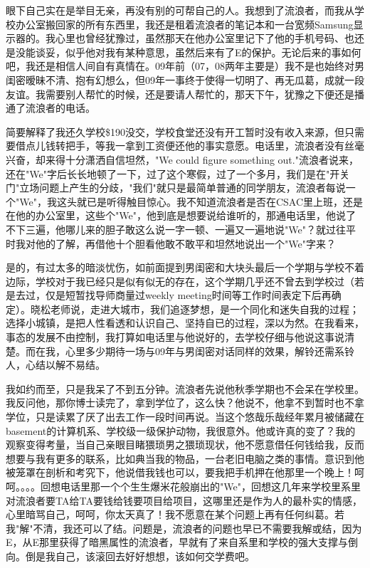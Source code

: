 \documentclass[12pt]{book}
\begin{document}
眼下自己实在是举目无亲，再没有别的可帮自己的人。我想到了流浪者，而我从学校办公室搬回家的所有东西里，我还是租着流浪者的笔记本和一台宽频Samsung显示器的。我心里也曾经犹豫过，虽然那天在他办公室里记下了他的手机号码、也还是没能谈妥，似乎他对我有某种意思，虽然后来有了E的保护。无论后来的事如何吧，我还是相信人间自有真情在。09年前（07，08两年主要是）我不是也始终对男闺密暧昧不清、抱有幻想么，但09年一事终于使得一切明了、再无瓜葛，成就一段友谊。我需要别人帮忙的时候，还是要请人帮忙的，那天下午，犹豫之下便还是播通了流浪者的电话。

简要解释了我还久学校\$190没交，学校食堂还没有开工暂时没有收入来源，但只需要借点儿钱转把手，等我一拿到工资便还他的事实意愿。电话里，流浪者没有丝毫兴奋，却来得十分潇洒自信坦然，"We could figure something out."流浪者说来，还在"We"字后长长地顿了一下，过了这个寒假，过了一个多月，我们是在"开关门"立场问题上产生的分歧，"我们"就只是最简单普通的同学朋友，流浪者每说一个"We"，我这头就已是听得触目惊心。我不知道流浪者是否在CSAC里上班，还是在他的办公室里，这些个"We"，他到底是想要说给谁听的，那通电话里，他说了不下三遍，他哪儿来的胆子敢这么说一字一顿、一遍又一遍地说"We"？就过往平时我对他的了解，再借他十个胆看他敢不敢平和坦然地说出一个"We"字来？

是的，有过太多的暗淡忧伤，如前面提到男闺密和大块头最后一个学期与学校不着边际，学校对于我已经只是似有似无的存在，这个学期几乎还不曾去到学校过（若是去过，仅是短暂找导师商量过weekly meeting时间等工作时间表定下后再确定）。晓松老师说，走进大城市，我们追逐梦想，是一个同化和迷失自我的过程；选择小城镇，是把人性看透和认识自己、坚持自已的过程，深以为然。在我看来，事态的发展不由控制，我打算如电话里与他说好的，去学校仔细与他说这事说清楚。而在我，心里多少期待一场与09年与男闺密对话同样的效果，解铃还需系铃人，心结以解不易结。

我如约而至，只是我呆了不到五分钟。流浪者先说他秋季学期也不会呆在学校里。我反问他，那你博士读完了，拿到学位了，这么快？他说不，他拿不到暂时也不拿学位，只是读累了厌了出去工作一段时间再说。当这个悠哉乐哉经年累月被储藏在basement的计算机系、学校级一级保护动物，我很意外。他或许真的变了？我的观察变得考量，当自己亲眼目睹猥琐男之猥琐现状，他不愿意借任何钱给我，反而想要与我有更多的联系，比如典当我的物品，一台老旧电脑之类的事情。意识到他被笼罩在剖析和考究下，他说借我钱也可以，要我把手机押在他那里一个晚上！呵呵。。。。回想电话里那一个个生生爆米花般崩出的"We"，回想这几年来学校里系里对流浪者要TA给TA要钱给钱要项目给项目，这哪里还是作为人的最朴实的情感，心里暗骂自己，呵呵，你太天真了！我不愿意在某个问题上再有任何纠葛。若我"解"不清，我还可以了结。问题是，流浪者的问题也早已不需要我解或结，因为E，从E那里获得了暗黑属性的流浪者，早就有了来自系里和学校的强大支撑与倒向。倒是我自己，该滚回去好好想想，该如何交学费吧。
\end{document}
